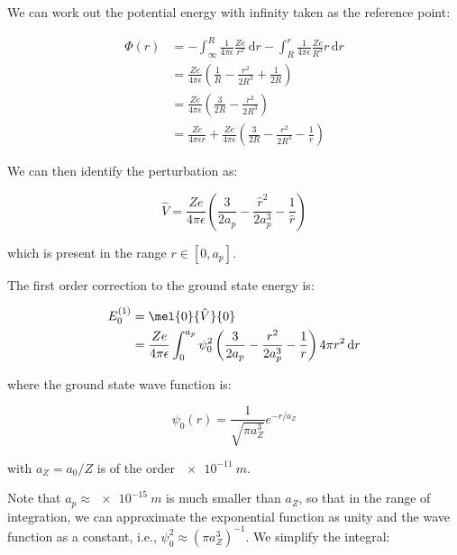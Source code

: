 \documentclass[12pt]{article}
\begin{document}
We can work out the potential energy with infinity taken as the reference point:

\begin{equation}
    \begin{split}
        \Phi(r) &= -\int_{\infty}^{R} \frac{1}{4\pi\epsilon} \frac{Ze}{r^{2}} \, \mathrm{d}r - \int_{R}^{r} \frac{1}{4\pi\epsilon} \frac{Ze}{R^{3}} r \, \mathrm{d}r \\
        &= \frac{Ze}{4\pi\epsilon} \left( \frac{1}{R} - \frac{r^{2}}{2R^{3}} + \frac{1}{2R} \right) \\
        &= \frac{Ze}{4\pi\epsilon} \left( \frac{3}{2R} - \frac{r^{2}}{2R^{3}} \right) \\
        &= \frac{Ze}{4\pi\epsilon r} + \frac{Ze}{4\pi\epsilon} \left( \frac{3}{2R} - \frac{r^{2}}{2R^{3}} - \frac{1}{r} \right)
    \end{split}
\end{equation}

We can then identify the perturbation as:

\begin{equation}
    \hat{V} = \frac{Ze}{4\pi\epsilon} \left( \frac{3}{2a_{p}} - \frac{\hat{r}^{2}}{2a_{p}^{3}} - \frac{1}{\hat{r}} \right)
\end{equation}

which is present in the range $r \in [0, a_{p}]$.

The first order correction to the ground state energy is:

\begin{equation}
    \begin{split}
        E_{0}^{(1)} &= \mel{0}{\hat{V}}{0} \\
        &= \frac{Ze}{4\pi\epsilon} \int_{0}^{a_{p}} \psi_{0}^{2} \left( \frac{3}{2a_{p}} - \frac{r^{2}}{2a_{p}^{3}} - \frac{1}{r} \right) 4\pi r^{2} \, \mathrm{d}r \\
    \end{split}
\end{equation}

where the ground state wave function is:

\begin{equation}
    \psi_{0}(r) = \frac{1}{\sqrt{\pi a_{Z}^{3}}} e^{-r/a_{Z}}
\end{equation}

with $a_{Z} = a_{0}/Z$ is of the order $\qty{e-11}{m}$.

Note that $a_{p} \approx \qty{e-15}{m}$ is much smaller than $a_{Z}$, so that in the range of integration, we can approximate the exponential function as unity and the wave function as a constant, i.e., $\psi_{0}^{2} \approx (\pi a_{Z}^{3})^{-1}$. We simplify the integral:
\end{document}
